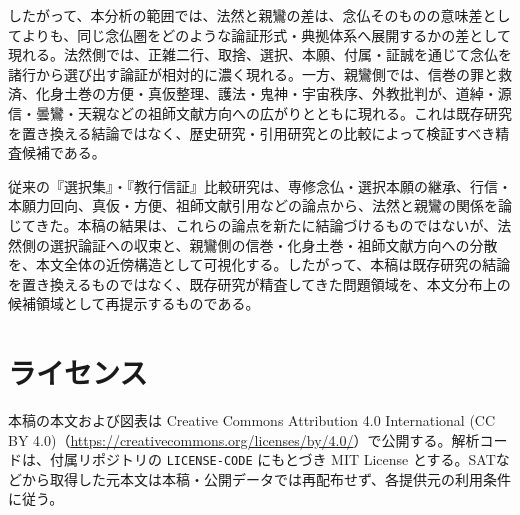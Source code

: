 \documentclass[uplatex,dvipdfmx,11pt,a4paper]{jsarticle}
\begin{document}
したがって、本分析の範囲では、法然と親鸞の差は、念仏そのものの意味差としてよりも、同じ念仏圏をどのような論証形式・典拠体系へ展開するかの差として現れる。法然側では、正雑二行、取捨、選択、本願、付属・証誠を通じて念仏を諸行から選び出す論証が相対的に濃く現れる。一方、親鸞側では、信巻の罪と救済、化身土巻の方便・真仮整理、護法・鬼神・宇宙秩序、外教批判が、道綽・源信・曇鸞・天親などの祖師文献方向への広がりとともに現れる。これは既存研究を置き換える結論ではなく、歴史研究・引用研究との比較によって検証すべき精査候補である。

従来の『選択集』・『教行信証』比較研究は、専修念仏・選択本願の継承、行信・本願力回向、真仮・方便、祖師文献引用などの論点から、法然と親鸞の関係を論じてきた。本稿の結果は、これらの論点を新たに結論づけるものではないが、法然側の選択論証への収束と、親鸞側の信巻・化身土巻・祖師文献方向への分散を、本文全体の近傍構造として可視化する。したがって、本稿は既存研究の結論を置き換えるものではなく、既存研究が精査してきた問題領域を、本文分布上の候補領域として再提示するものである。

\section*{ライセンス}

本稿の本文および図表は Creative Commons Attribution 4.0 International (CC BY 4.0)（\url{https://creativecommons.org/licenses/by/4.0/}）で公開する。解析コードは、付属リポジトリの \texttt{LICENSE-CODE} にもとづき MIT License とする。SATなどから取得した元本文は本稿・公開データでは再配布せず、各提供元の利用条件に従う。
\end{document}
